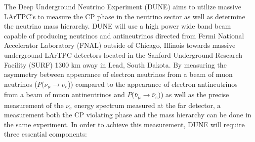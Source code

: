 
The Deep Underground Neutrino Experiment (DUNE) \cite{DUNE} aims to utilize massive LArTPC's to measure the CP phase in the neutrino sector as well as determine the neutrino mass hierarchy. DUNE will use a high power wide band beam capable of producing neutrinos and antineutrinos directed from Fermi National Accelerator Laboratory (FNAL) outside of Chicago, Illinois towards massive underground LArTPC detectors located in the Sanford Underground Research Facility (SURF) 1300 km away in Lead, South Dakota. By measuring the asymmetry between appearance of electron neutrinos from a beam of muon neutrinos ($P(\nu_{\mu} \rightarrow \nu_{e}$)) compared to the appearance of electron antineutrinos from a beam of muon antineutrinos and $P(\bar{\nu}_{\mu} \rightarrow \bar{\nu}_{e}$)) as well as the precise measurement of the $\nu_{e}$ energy spectrum measured at the far detector, a measurement both the CP violating phase and the mass hierarchy can be done in the same experiment. In order to achieve this measurement, DUNE will require three essential components:
